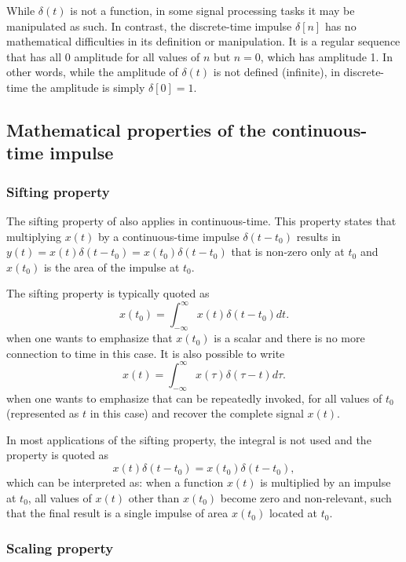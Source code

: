 While $\delta(t)$ is not a function, in some signal processing tasks it may be manipulated as such. In contrast, 
the discrete-time impulse $\delta[n]$ has no mathematical difficulties in its definition or manipulation. It is a regular sequence that has all 0 amplitude for all values of $n$ but $n=0$, which has amplitude 1. In other words, while the amplitude of $\delta(t)$ is not defined (infinite), in discrete-time the amplitude is simply $\delta[0]=1$.

\subsection{Mathematical properties of the continuous-time impulse}

\subsubsection{Sifting property}
\label{sec:sifting}

The sifting property of  also applies in continuous-time.
This property states that multiplying $x(t)$ by a continuous-time impulse $\delta(t-t_0)$ results in $y(t) = x(t) \delta(t-t_0) = x(t_0) \delta(t-t_0)$ that is non-zero only at $t_0$ and $x(t_0)$ is the area of the impulse at $t_0$.

The sifting property is typically quoted as
\begin{equation}
x(t_0) = \int_{-\infty}^\infty {x(t) \delta(t-t_0)} dt.
\label{eq:sifting_sample}
\end{equation}
when one wants to emphasize that $x(t_0)$ is a scalar and there is no more connection to time in this case. It is also possible to write
\[
x(t) = \int_{-\infty}^\infty {x(\tau) \delta(\tau-t)} d \tau.
\]
when one wants to emphasize that  can be repeatedly invoked, for all values of $t_0$ (represented as $t$ in this case) and recover the complete signal $x(t)$.

In most applications of the sifting property, the integral is not used and the property is quoted as
\[
x(t) \delta(t-t_0) = x(t_0) \delta(t-t_0),
\]
which can be interpreted as: when a function $x(t)$ is multiplied by an impulse at $t_0$, all values of $x(t)$ other than $x(t_0)$ become zero and non-relevant, such that the final result is a single impulse of area $x(t_0)$ located  at $t_0$.

\subsubsection{Scaling property}
\label{impulse_scaling_property}

